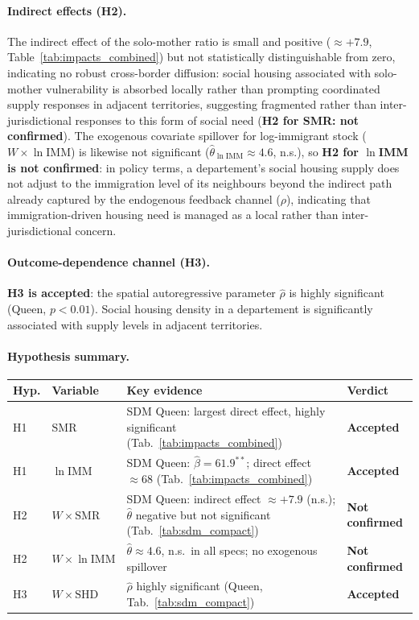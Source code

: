 \documentclass[a4paper,12pt]{article}
\begin{document}
\paragraph{Indirect effects (H2).}
The indirect effect of the solo-mother ratio is small and positive ($\approx +7.9$, Table~\ref{tab:impacts_combined}) but not statistically distinguishable from zero, indicating no robust cross-border diffusion: social housing associated with solo-mother vulnerability is absorbed locally rather than prompting coordinated supply responses in adjacent territories, suggesting fragmented rather than inter-jurisdictional responses to this form of social need (\textbf{H2 for SMR: not confirmed}). The exogenous covariate spillover for log-immigrant stock ($W\!\times\!\ln\mathrm{IMM}$) is likewise not significant ($\hat{\theta}_{\ln\mathrm{IMM}} \approx 4.6$, n.s.), so \textbf{H2 for $\ln$IMM is not confirmed}: in policy terms, a departement's social housing supply does not adjust to the immigration level of its neighbours beyond the indirect path already captured by the endogenous feedback channel ($\rho$), indicating that immigration-driven housing need is managed as a local rather than inter-jurisdictional concern.

\paragraph{Outcome-dependence channel (H3).}
\textbf{H3 is accepted}: the spatial autoregressive parameter $\hat{\rho}$ is highly significant (Queen, $p < 0.01$). Social housing density in a departement is significantly associated with supply levels in adjacent territories.

\paragraph{Hypothesis summary.}

\medskip
\begin{center}
\small
\renewcommand{\arraystretch}{1.35}
\begin{tabular}{llp{7.5cm}l}
\toprule
\textbf{Hyp.} & \textbf{Variable} & \textbf{Key evidence} & \textbf{Verdict} \\
\midrule
H1 & $\mathrm{SMR}$ & SDM Queen: largest direct effect, highly significant (Tab.~\ref{tab:impacts_combined}) & \textbf{Accepted} \\
H1 & $\ln\mathrm{IMM}$ & SDM Queen: $\hat{\beta} = 61.9^{**}$; direct effect $\approx 68$ (Tab.~\ref{tab:impacts_combined}) & \textbf{Accepted} \\
H2 & $W\!\times\!\mathrm{SMR}$ & SDM Queen: indirect effect $\approx +7.9$ (n.s.); $\hat{\theta}$ negative but not significant (Tab.~\ref{tab:sdm_compact}) & \textbf{Not confirmed} \\
H2 & $W\!\times\!\ln\mathrm{IMM}$ & $\hat{\theta} \approx 4.6$, n.s.\ in all specs; no exogenous spillover & \textbf{Not confirmed} \\
H3 & $W\!\times\!\mathrm{SHD}$ & $\hat{\rho}$ highly significant (Queen, Tab.~\ref{tab:sdm_compact}) & \textbf{Accepted} \\
\bottomrule
\end{tabular}
\end{center}
\end{document}
